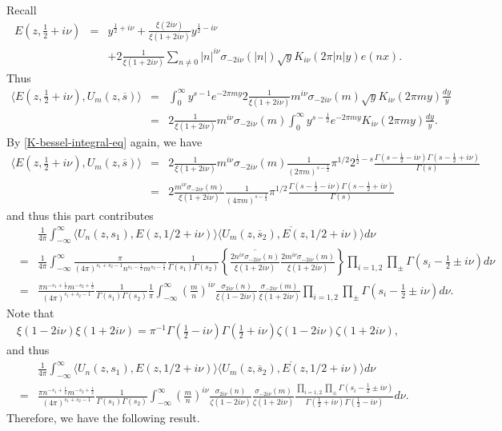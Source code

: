 \documentclass[11pt,reqno]{amsart}
\newcommand{\bea}{\begin{eqnarray}}
\newcommand{\eea}{\end{eqnarray}}
\newcommand{\bna}{\begin{eqnarray*}}
\newcommand{\ena}{\end{eqnarray*}}
\theoremstyle{definition}
\begin{document}
\subsubsection{}
Recall
\bna
E(z,\frac{1}{2}+i\nu)&=&y^{\frac{1}{2}+i\nu}
+\frac{\xi(2i\nu)}{\xi(1+2i\nu)}y^{\frac{1}{2}-i\nu}\\
&&
+2\frac{1}{\xi(1+2i\nu)}\sum_{n\neq 0}|n|^{i\nu}\sigma_{-2i\nu}(|n|)\sqrt{y} K_{i\nu}(2\pi |n|y) e(nx).
\ena
Thus
\bna
\langle E(z,\frac{1}{2}+i\nu),U_m(z,\overline s)\rangle
&=&\int_0^\infty y^{s-1}e^{-2\pi my}
2\frac{1}{\xi(1+2i\nu)} m^{i\nu}\sigma_{-2i\nu}(m)\sqrt{y} K_{i\nu}(2\pi my)\frac{dy}{y}\\
&=&2\frac{1}{\xi(1+2i\nu)} m^{i\nu}\sigma_{-2i\nu}(m)\int_0^\infty y^{s-\frac{1}{2}}e^{-2\pi my}K_{i\nu}(2\pi my)\frac{dy}{y}.
\ena
By \eqref{K-bessel-integral-eq} again, we have
\bea
\nonumber\langle E(z,\frac{1}{2}+i\nu),U_m(z,\overline s)\rangle
&=&2\frac{1}{\xi(1+2i\nu)} m^{i\nu}\sigma_{-2i\nu}(m)\frac{1}{(2\pi m)^{s-\frac{1}{2}}}
\pi^{1/2}2^{\frac{1}{2}-s}\frac{\Gamma(s-\frac{1}{2}-i\nu)\Gamma(s-\frac{1}{2}+i\nu)}
{\Gamma(s)}\\
&=&2\frac{m^{i\nu}\sigma_{-2i\nu}(m)}{\xi(1+2i\nu)} \frac{1}{(4\pi m)^{s-\frac{1}{2}}}
\pi^{1/2}\frac{\Gamma(s-\frac{1}{2}-i\nu)\Gamma(s-\frac{1}{2}+i\nu)}{\Gamma(s)}
\label{Poincare-inner-wt-Eisen}
\eea
and thus this part contributes
\bna
&&\frac{1}{4\pi}
\int_{-\infty}^\infty
\langle U_n(z,s_1),E(z,1/2+i\nu)\rangle
\overline{\langle U_m(z,\overline s_2),E(z,1/2+i\nu)\rangle }d\nu\\
&=&\frac{1}{4\pi}
\int_{-\infty}^\infty
\frac{\pi}{(4\pi)^{s_1+s_2-1}n^{s_1-\frac{1}{2}}m^{s_2-\frac{1}{2}}}
\frac{1}{\Gamma(s_1)\Gamma(s_2)}
\left\{\overline{\frac{2n^{i\nu}\sigma_{-2i\nu}(n)}{\xi(1+2i\nu)}}\frac{2m^{i\nu}\sigma_{-2i\nu}(m)}{\xi(1+2i\nu)}\right\}
\prod_{i=1,2}\prod_{\pm}\Gamma(s_i-\frac{1}{2}\pm i\nu)
d\nu\\
&=&
\frac{\pi n^{-s_1+\frac{1}{2}}m^{-s_2+\frac{1}{2}}}{(4\pi)^{s_1+s_2-1}}
\frac{1}{\Gamma(s_1)\Gamma(s_2)}
\frac{1}{\pi}
\int_{-\infty}^\infty
\left(\frac{m}{n}\right)^{i\nu}\frac{\sigma_{2i\nu}(n)}{\xi(1-2i\nu)}
\frac{\sigma_{-2i\nu}(m)}{\xi(1+2i\nu)}
\prod_{i=1,2}\prod_{\pm}\Gamma(s_i-\frac{1}{2}\pm i\nu)
d\nu.
\ena
Note that
\bna
\xi(1-2i\nu)
\xi(1+2i\nu)=\pi^{-1}\Gamma(\frac{1}{2}-i\nu)\Gamma(\frac{1}{2}+i\nu)
\zeta(1-2i\nu)\zeta(1+2i\nu),
\ena
and thus
\bna
&&\frac{1}{4\pi}
\int_{-\infty}^\infty
\langle U_n(z,s_1),E(z,1/2+i\nu)\rangle
\overline{\langle U_m(z,\overline s_2),E(z,1/2+i\nu)\rangle }d\nu\\
&=&\frac{\pi n^{-s_1+\frac{1}{2}}m^{-s_2+\frac{1}{2}}}{(4\pi)^{s_1+s_2-1}}
\frac{1}{\Gamma(s_1)\Gamma(s_2)}
\int_{-\infty}^\infty
\left(\frac{m}{n}\right)^{i\nu}\frac{\sigma_{2i\nu}(n)}{\zeta(1-2i\nu)}
\frac{\sigma_{-2i\nu}(m)}{\zeta(1+2i\nu)}
\frac{\prod_{i=1,2}\prod_{\pm}\Gamma(s_i-\frac{1}{2}\pm i\nu)}{\Gamma(\frac{1}{2}+i\nu)\Gamma(\frac{1}{2}-i\nu)}
d\nu.
\ena
Therefore, we have the following result.
\end{document}
